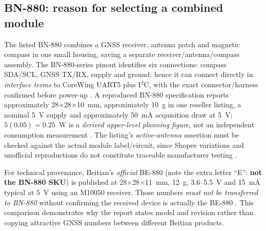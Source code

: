 \subsection{BN-880: reason for selecting a combined module}
The listed BN-880 combines a GNSS receiver, antenna patch and magnetic compass in one small housing, saving a separate receiver/antenna/compass assembly. The BN-880-series pinout identifies six connections: compass SDA/SCL, GNSS TX/RX, supply and ground; hence it can connect directly in \emph{interface terms} to CoreWing UART5 plus I$^2$C, with the exact connector/harness confirmed before power-up \cite{bnShop,bn880Series,coreDoc}. A reproduced BN-880 specification reports approximately 28$\times$28$\times$10~mm, approximately 10~g in one reseller listing, a nominal 5~V supply and approximately 50~mA acquisition draw at 5~V; $5(0.05)=0.25$~W is a \emph{derived upper-level planning figure}, not an independent consumption measurement \cite{bn880Secondary,bn880Series}. The listing's \emph{active-antenna} assertion must be checked against the actual module label/circuit, since Shopee variations and unofficial reproductions do not constitute traceable manufacturer testing \cite{bnShop,bnData}.

For technical provenance, Beitian's \emph{official} BE-880 (note the extra letter ``E'': \textbf{not the BN-880 SKU}) is published at 28$\times$28$\times$11~mm, 12~g, 3.6--5.5~V and 15~mA typical at 5~V using an M10050 receiver. Those numbers \emph{must not be transferred to BN-880} without confirming the received device is actually the BE-880 \cite{beitianOfficialBE}. This comparison demonstrates why the report states model and revision rather than copying attractive GNSS numbers between different Beitian products.

